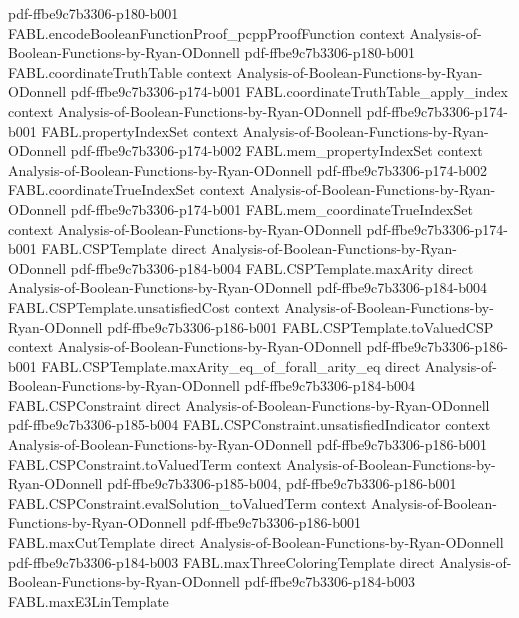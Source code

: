 \begin{theorem}
  {pdf-ffbe9c7b3306-p180-b001}
\proofstep
  {FABL.encodeBooleanFunctionProof_pcppProofFunction}
  {context}
  {Analysis-of-Boolean-Functions-by-Ryan-ODonnell}
  {pdf-ffbe9c7b3306-p180-b001}
\proofstep
  {FABL.coordinateTruthTable}
  {context}
  {Analysis-of-Boolean-Functions-by-Ryan-ODonnell}
  {pdf-ffbe9c7b3306-p174-b001}
\proofstep
  {FABL.coordinateTruthTable_apply_index}
  {context}
  {Analysis-of-Boolean-Functions-by-Ryan-ODonnell}
  {pdf-ffbe9c7b3306-p174-b001}
\proofstep
  {FABL.propertyIndexSet}
  {context}
  {Analysis-of-Boolean-Functions-by-Ryan-ODonnell}
  {pdf-ffbe9c7b3306-p174-b002}
\proofstep
  {FABL.mem_propertyIndexSet}
  {context}
  {Analysis-of-Boolean-Functions-by-Ryan-ODonnell}
  {pdf-ffbe9c7b3306-p174-b002}
\proofstep
  {FABL.coordinateTrueIndexSet}
  {context}
  {Analysis-of-Boolean-Functions-by-Ryan-ODonnell}
  {pdf-ffbe9c7b3306-p174-b001}
\proofstep
  {FABL.mem_coordinateTrueIndexSet}
  {context}
  {Analysis-of-Boolean-Functions-by-Ryan-ODonnell}
  {pdf-ffbe9c7b3306-p174-b001}
\proofstep
  {FABL.CSPTemplate}
  {direct}
  {Analysis-of-Boolean-Functions-by-Ryan-ODonnell}
  {pdf-ffbe9c7b3306-p184-b004}
\proofstep
  {FABL.CSPTemplate.maxArity}
  {direct}
  {Analysis-of-Boolean-Functions-by-Ryan-ODonnell}
  {pdf-ffbe9c7b3306-p184-b004}
\proofstep
  {FABL.CSPTemplate.unsatisfiedCost}
  {context}
  {Analysis-of-Boolean-Functions-by-Ryan-ODonnell}
  {pdf-ffbe9c7b3306-p186-b001}
\proofstep
  {FABL.CSPTemplate.toValuedCSP}
  {context}
  {Analysis-of-Boolean-Functions-by-Ryan-ODonnell}
  {pdf-ffbe9c7b3306-p186-b001}
\proofstep
  {FABL.CSPTemplate.maxArity_eq_of_forall_arity_eq}
  {direct}
  {Analysis-of-Boolean-Functions-by-Ryan-ODonnell}
  {pdf-ffbe9c7b3306-p184-b004}
\proofstep
  {FABL.CSPConstraint}
  {direct}
  {Analysis-of-Boolean-Functions-by-Ryan-ODonnell}
  {pdf-ffbe9c7b3306-p185-b004}
\proofstep
  {FABL.CSPConstraint.unsatisfiedIndicator}
  {context}
  {Analysis-of-Boolean-Functions-by-Ryan-ODonnell}
  {pdf-ffbe9c7b3306-p186-b001}
\proofstep
  {FABL.CSPConstraint.toValuedTerm}
  {context}
  {Analysis-of-Boolean-Functions-by-Ryan-ODonnell}
  {pdf-ffbe9c7b3306-p185-b004,
    pdf-ffbe9c7b3306-p186-b001}
\proofstep
  {FABL.CSPConstraint.evalSolution_toValuedTerm}
  {context}
  {Analysis-of-Boolean-Functions-by-Ryan-ODonnell}
  {pdf-ffbe9c7b3306-p186-b001}
\proofstep
  {FABL.maxCutTemplate}
  {direct}
  {Analysis-of-Boolean-Functions-by-Ryan-ODonnell}
  {pdf-ffbe9c7b3306-p184-b003}
\proofstep
  {FABL.maxThreeColoringTemplate}
  {direct}
  {Analysis-of-Boolean-Functions-by-Ryan-ODonnell}
  {pdf-ffbe9c7b3306-p184-b003}
\proofstep
  {FABL.maxE3LinTemplate}

\end{theorem}
